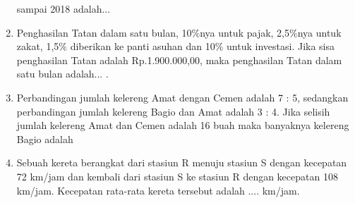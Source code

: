 \documentclass[12pt,a4paper,draft,final,oneside,twoside,openright,openany]{article}
\begin{document}
\begin{enumerate}
		sampai 2018 adalah...
		\item Penghasilan Tatan dalam satu bulan, 10$\%$nya
		untuk pajak, 2,5$\%$nya untuk zakat, 1,5$\%$ diberikan
		ke panti asuhan dan 10$\%$ untuk investasi. Jika sisa
		penghasilan Tatan adalah Rp.1.900.000,00, maka
		penghasilan Tatan dalam satu bulan adalah... .
		\item Perbandingan jumlah kelereng Amat dengan Cemen
		adalah 7 : 5, sedangkan perbandingan jumlah
		kelereng Bagio dan Amat adalah 3 : 4. Jika selisih jumlah
		kelereng Amat dan Cemen adalah 16 buah maka
		banyaknya kelereng Bagio adalah
		\item Sebuah kereta berangkat dari stasiun R menuju stasiun
		S dengan kecepatan 72 km/jam dan kembali dari
		stasiun S ke stasiun R dengan kecepatan 108 km/jam.
		Kecepatan rata-rata kereta tersebut adalah .... km/jam.
	\end{enumerate}
\end{document}
